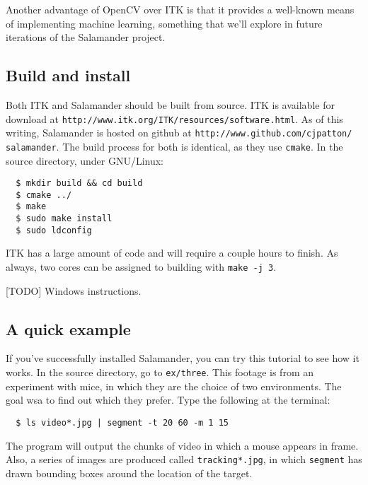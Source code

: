 \documentclass[letter]{article}
\newcounter{foot}
\begin{document}
Another advantage of OpenCV over ITK is that it provides a well-known means of implementing
machine learning, something that we'll explore in future iterations of the Salamander 
project. 

\subsection{Build and install}
Both ITK and Salamander should be built from source. ITK is available for download at 
\texttt{http://www.itk.org/ITK/resources/software.html}. As of this writing, Salamander 
is hosted on github at \texttt{http://www.github.com/cjpatton/ salamander}. The build 
process for both is identical, as they use \texttt{cmake}. In the source directory, 
under GNU/Linux: 
\begin{verbatim}
  $ mkdir build && cd build
  $ cmake ../ 
  $ make
  $ sudo make install 
  $ sudo ldconfig
\end{verbatim}
ITK has a large amount of code and will require a couple hours to finish. As always, 
two cores can be assigned to building with \texttt{make -j 3}. 

[TODO] Windows instructions.

\subsection{A quick example} 
If you've successfully installed Salamander, you can try this tutorial to see how it 
works. In the source directory, go to \texttt{ex/three}. This footage is from an 
experiment with mice, in which they are the choice of two environments. The goal 
wsa to find out which they prefer. Type the following at the terminal:
\begin{verbatim}
  $ ls video*.jpg | segment -t 20 60 -m 1 15 
\end{verbatim}
The program will output the chunks of video in which a mouse appears in frame. Also,
a series of images are produced called \texttt{tracking*.jpg}, in which \texttt{segment}
has drawn bounding boxes around the location of the target. 
\end{document}
